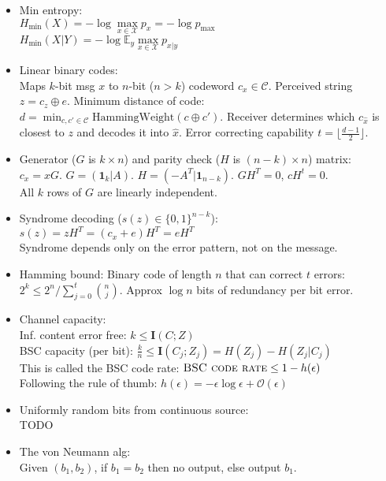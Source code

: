 \documentclass[twocolumn,9pt]{extarticle}
\begin{document}
\begin{itemize}
	\item Min entropy: \\
	$H_{\text{min}}(X) = -\log \max\limits_{x \in \mathcal{X}} p_x = -\log p_{\text{max}}$\\
	$H_{\text{min}}(X|Y) = -\log \mathbb{E}_y \max\limits_{x \in \mathcal{X}} p_{x|y}$

	\item Linear binary codes: \\
	Maps $k$-bit msg $x$ to $n$-bit ($n > k$) codeword $c_x \in \mathcal{C}$. Perceived string $z = c_z \oplus e$. Minimum distance of code: $d = \min_{c,c'\in\mathcal{C}} \text{HammingWeight}(c \oplus c')$. Receiver determines which $c_{\hat{x}}$ is closest to $z$ and decodes it into $\hat{x}$. Error correcting capability $t = \lfloor\frac{d-1}{2}\rfloor$.

	\item Generator ($G$ is $k \times n$) and parity check ($H$ is $(n-k) \times n$) matrix: \\
	$c_x = xG$. $G = (\mathbf{1}_k|A)$. $H = (-A^T|\mathbf{1}_{n-k})$. $GH^T= 0$, $cH^t=0$.\\
	All $k$ rows of $G$ are linearly independent.

	\item Syndrome decoding ($s(z) \in \{0,1\}^{n-k}$):\\
	$s(z) = zH^T = (c_x + e)H^T = eH^T$\\
	Syndrome depends only on the error pattern, not on the message.

	\item Hamming bound: Binary code of length $n$ that can correct $t$ errors:
	$2^k \leq 2^n / \sum_{j=0}^t \binom nj$. Approx $\log n$ bits of redundancy per bit error.

	\item Channel capacity:\\
	Inf. content error free: $k \leq \mathbf{I}(C;Z)$\\
	BSC capacity (per bit): $\frac{k}{n} \leq \mathbf{I}(C_j;Z_j) = H(Z_j) - H(Z_j|C_j)$ \\
	This is called the BSC code rate: $\textsc{BSC code rate} \leq 1 - h(\epsilon)$ \\
	Following the rule of thumb: $h(\epsilon) = -\epsilon \log \epsilon + \mathcal{O}(\epsilon)$

	\item Uniformly random bits from continuous source:\\
	TODO

	\item The von Neumann alg: \\
	Given $(b_1, b_2)$, if $b_1 = b_2$ then no output, else output $b_1$.


\end{itemize}
\end{document}
